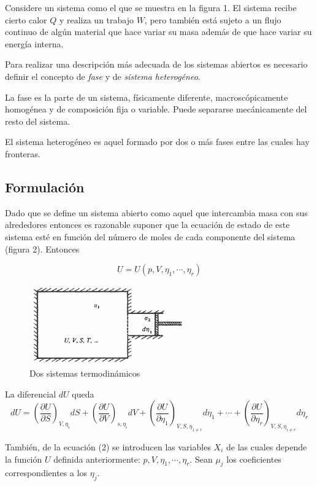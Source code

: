\documentclass[a4paper,12pt]{article}
\begin{document}
Considere un sistema como el que se muestra en la figura 1. El sistema recibe cierto calor $Q$ y realiza un trabajo $W$, pero también está sujeto a un flujo continuo de algún material que hace variar su masa además de que hace variar su energía interna.

Para realizar una descripción más adecuada de los sistemas abiertos es necesario definir el concepto de \textit{fase} y de \textit{sistema heterogéneo}.

La fase es la parte de un sistema, físicamente diferente, macroscópicamente homogénea y de composición fija o variable. Puede separarse mecánicamente del resto del sistema.

El sistema heterogéneo es aquel formado por dos o más fases entre las cuales hay fronteras.

\subsection{Formulación}
Dado que se define un sistema abierto como aquel que intercambia masa con sus alrededores entonces es razonable suponer que la ecuación de estado de este sistema esté en función del número de moles de cada componente del sistema (figura 2). Entonces

\[
	U = U(p, V, \eta_1, \cdots, \eta_r)
\]

\begin{figure}[h!]
	\centering
		\includegraphics[width=0.60\textwidth]{Figure2.png}
	\caption{Dos sistemas termodinámicos}
\end{figure}

La diferencial $dU$ queda
\begin{equation}
	dU = \left ( \frac{\partial U}{\partial S} \right )_{V, \eta_i} dS + \left ( \frac{\partial U}{\partial V} \right )_{s, \eta_i} dV + \left ( \frac{\partial U}{\partial \eta_1} \right )_{V, S, \eta_{1 \neq r}} d \eta_1 + \cdots +  \left ( \frac{\partial U}{\partial \eta_r} \right )_{V, S, \eta_{i \neq r}} d \eta_r
\end{equation}

También, de la ecuación (2) se introducen las variables $X_i$ de las cuales depende la función $U$ definida anteriormente: $p, V, \eta_1, \cdots, \eta_r$. Sean $\mu_j$ los coeficientes correspondientes a los $\eta_j$.
\end{document}
